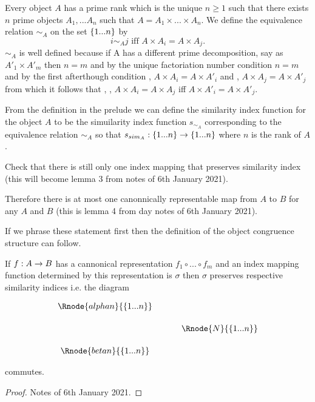 \documentclass[10pt,a4paper]{scrartcl}
\begin{document}
\begin{definition}
Every object $A$ has a prime rank which is the unique $n \geq 1$ such that
there exists $n$ prime objects $A_1,...A_n$ such that $A=A_1 \times ... \times A_n$.
We define the equivalence relation $\sim_A$ on the set $\left\{1...n\right\}$ by
\begin{equation*}
i \sim_A j \mbox{ iff } A \times A_i = A \times A_j.
\end{equation*}
$\sim_A$ is well defined because if A has a different prime decomposition, say as 
$A'_1 \times A'_m$ then $n=m$ and by the unique factoriation number condition $n=m$
and by the first afterthough condition \foreachi, 
$A \times A_i = A \times A'_i$
and \foreachj, 
$A \times A_j = A \times A'_j$
from which it follows that \foreachi, \foreachj,
$A \times A_i = A \times A_j $ iff $A \times A'_i = A \times A'_j $.
\end{definition}

From the definition in the prelude we can define the similarity index function for the object $A$
to be the simuilarity index function $s_{\sim_A}$ corresponding to the equivalence relation 
$\sim_A$ so that $s_{sim_A}: \left\{1...n\right\} \rightarrow \left\{1...n\right\}$ where $n$ is the rank of $A$.
\begin{notebox}
Check that there is still only one index mapping that preserves similarity index
(this will become lemma 3 from notes of 6th January 2021).

Therefore
there is at most one canonnically representable map from $A$ to $B$ for any $A$ and $B$
(this is lemma 4 from day notes of 6th January 2021).

If we phrase these statement first then the definition of the object congruence structure can follow.
\end{notebox}

\begin{lemma}
If $f: A \rightarrow B$ has a cannonical representation $f_1 \circ ...\circ f_m$ and an index mapping function determined by this representation is $\sigma$ then $\sigma$ preserves 
respective similarity indices i.e. the diagram

\begin{center}
\begin{equation}
\label{preservingcopynumber}
\begin{array}{cp{.5cm}c}
\Rnode{alphan}{\set{\n}}  &&              \\ [0.5cm]
												  && \Rnode{N}{\set{\n}} \\ [0.5cm]
\Rnode{betan}{\set{\n}}   &&            
\end{array}
\end{equation}
\blabel{\sigma}
\end{center}
commutes.
\end{lemma}
\begin{proof}
Notes of 6th January 2021.
\end{proof}
\end{document}
